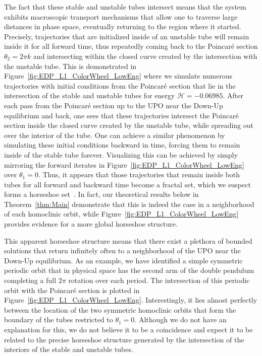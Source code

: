 \documentclass[11pt]{article}
\numberwithin{equation}{section}
\theoremstyle{plain}
\begin{document}
The fact that these stable and unstable tubes intersect means that the system exhibits macroscopic transport mechanisms that allow one to traverse large distances in phase space, eventually returning to the region where it started. Precisely, trajectories that are initialized inside of an unstable tube will remain inside it for all forward time, thus repeatedly coming back to the Poincar\'e section $\theta_2 = 2\pi k$ and intersecting within the closed curve created by the intersection with the unstable tube. This is demonstrated in Figure~\ref{fig:EDP_L1_ColorWheel_LowEng} where we simulate numerous trajectories with initial conditions from the Poincar\'e section that lie in the intersection of the stable and unstable tubes for energy $\mathcal{H}=-0.06985$. After each pass from the Poincar\'e section up to the UPO near the Down-Up equilibrium and back, one sees that these trajectories intersect the Poincar\'e section inside the closed curve created by the unstable tube, while spreading out over the interior of the tube. One can achieve a similar phenomenon by simulating these initial conditions backward in time, forcing them to remain inside of the stable tube forever. Visualizing this can be achieved by simply mirroring the forward iterates in Figure~\ref{fig:EDP_L1_ColorWheel_LowEng} over $\theta_1 = 0$. Thus, it appears that those trajectories that remain inside both tubes for all forward and backward time become a fractal set, which we suspect forms a horseshoe set~\cite{Smale}. In fact, our theoretical results below in Theorem~\ref{thm:Main} demonstrate that this is indeed the case in a neighborhood of each homoclinic orbit, while Figure~\ref{fig:EDP_L1_ColorWheel_LowEng} provides evidence for a more global horseshoe structure.     

This apparent horseshoe structure means that there exist a plethora of bounded solutions that return infinitely often to a neighborhood of the UPO near the Down-Up equilibrium. As an example, we have identified a simple symmetric periodic orbit that in physical space has the second arm of the double pendulum completing a full $2\pi$ rotation over each period. 
The intersection of this periodic orbit with the Poincar\'e section is plotted in Figure~\ref{fig:EDP_L1_ColorWheel_LowEng}. Interestingly, it lies almost perfectly between the location of the two symmetric homoclinic orbits that form the boundary of the tubes restricted to $\theta_1 = 0$. Although we do not have an explanation for this, we do not believe it to be a coincidence and expect it to be related to the precise horseshoe structure generated by the intersection of the interiors of the stable and unstable tubes.    
\end{document}
